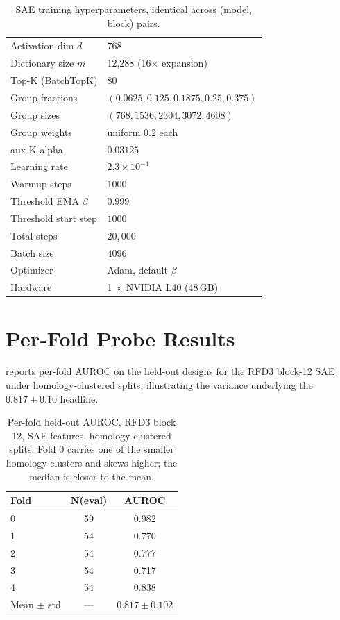 \documentclass{article}
\theoremstyle{plain}
\theoremstyle{definition}
\theoremstyle{remark}
\begin{document}
\begin{table}[h]
\centering
\begin{tabular}{ll}
\toprule
Activation dim $d$ & 768 \\
Dictionary size $m$ & 12{,}288 (16$\times$ expansion) \\
Top-K (BatchTopK) & 80 \\
Group fractions & $(0.0625, 0.125, 0.1875, 0.25, 0.375)$ \\
Group sizes & $(768, 1536, 2304, 3072, 4608)$ \\
Group weights & uniform $0.2$ each \\
aux-K alpha & $0.03125$ \\
Learning rate & $2.3 \times 10^{-4}$ \\
Warmup steps & $1000$ \\
Threshold EMA $\beta$ & $0.999$ \\
Threshold start step & $1000$ \\
Total steps & $20{,}000$ \\
Batch size & $4096$ \\
Optimizer & Adam, default $\beta$ \\
Hardware & 1 $\times$ NVIDIA L40 (48\,GB) \\
\bottomrule
\end{tabular}
\caption{SAE training hyperparameters, identical across (model, block) pairs.}
\end{table}

\section{Per-Fold Probe Results}
\label{app:perfold}

 reports per-fold AUROC on the held-out designs for the RFD3 block-12 SAE under homology-clustered splits, illustrating the variance underlying the $0.817 \pm 0.10$ headline.

\begin{table}[h]
\centering
\begin{tabular}{lcc}
\toprule
Fold & N(eval) & AUROC \\
\midrule
0 & 59 & 0.982 \\
1 & 54 & 0.770 \\
2 & 54 & 0.777 \\
3 & 54 & 0.717 \\
4 & 54 & 0.838 \\
\midrule
Mean $\pm$ std & --- & $0.817 \pm 0.102$ \\
\bottomrule
\end{tabular}
\caption{Per-fold held-out AUROC, RFD3 block 12, SAE features, homology-clustered splits. Fold 0 carries one of the smaller homology clusters and skews higher; the median is closer to the mean.}
\label{tab:perfold_block12}
\end{table}
\end{document}
